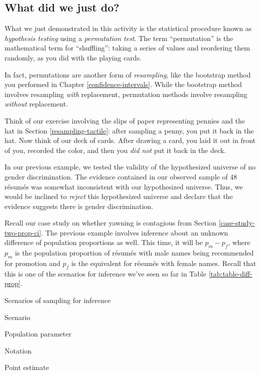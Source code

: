 \documentclass[
]{book}
\begin{document}
\hypertarget{ht-what-did-we-just-do}{%
\subsection{What did we just do?}\label{ht-what-did-we-just-do}}

What we just demonstrated in this activity is the statistical procedure known as \emph{hypothesis testing} using a \emph{permutation test}. The term ``permutation''  is the mathematical term for ``shuffling'': taking a series of values and reordering them randomly, as you did with the playing cards.

In fact, permutations are another form of \emph{resampling}, like the bootstrap method you performed in Chapter \ref{confidence-intervals}. While the bootstrap method involves resampling \emph{with} replacement, permutation methods involve resampling \emph{without} replacement.

Think of our exercise involving the slips of paper representing pennies and the hat in Section \ref{resampling-tactile}: after sampling a penny, you put it back in the hat. Now think of our deck of cards. After drawing a card, you laid it out in front of you, recorded the color, and then you \emph{did not} put it back in the deck.

In our previous example, we tested the validity of the hypothesized universe of no gender discrimination. The evidence contained in our observed sample of 48 résumés was somewhat inconsistent with our hypothesized universe. Thus, we would be inclined to \emph{reject} this hypothesized universe and declare that the evidence suggests there is gender discrimination.

Recall our case study on whether yawning is contagious from Section \ref{case-study-two-prop-ci}. The previous example involves inference about an unknown difference of population proportions as well. This time, it will be \(p_{m} - p_{f}\), where \(p_{m}\) is the population proportion of résumés with male names being recommended for promotion and \(p_{f}\) is the equivalent for résumés with female names. Recall that this is one of the scenarios for inference we've seen so far in Table \ref{tab:table-diff-prop}.

\label{tab:table-diff-prop}Scenarios of sampling for inference

Scenario

Population parameter

Notation

Point estimate
\end{document}
